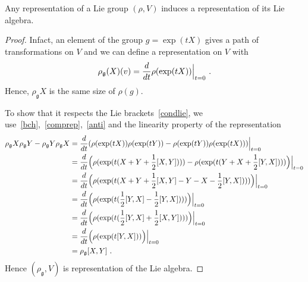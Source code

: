     Any representation of a Lie group $(\rho, V)$ induces a representation of its Lie algebra. 
    \begin{proof}
        Infact, an element of the group $g = \exp(tX)$ gives a path of transformations on $V$ and we can define a representation on $V$ with 
        \begin{equation}\label{repalg}
            \rho_{\mathfrak g} (X) (v) = \frac{d}{dt} \rho (\exp(tX)) \Big \vert_{t=0} ~.
        \end{equation}
        Hence, $\rho_{\mathfrak g} X $ is the same size of $\rho(g)$. 
        
        To show that it respects the Lie brackets~\eqref{condlie}, we use~\eqref{bch},~\eqref{comprep},~\eqref{anti} and the linearity property of the representation
        \begin{equation*}
        \begin{aligned}
            \rho_{\mathfrak g} X \rho_{\mathfrak g} Y - \rho_{\mathfrak g} Y \rho_{\mathfrak g} X & = \frac{d}{dt} (\rho (\exp(tX)) \rho (\exp(tY)) - \rho (\exp(tY)) \rho (\exp(tX)) ) \Big \vert_{t=0} \\ & = \frac{d}{dt} \Big (\rho (\exp(t(X + Y + \frac{1}{2}[X, Y]))) - \rho (\exp(t(Y + X + \frac{1}{2}[Y, X]))) \Big ) \Big \vert_{t=0} \\ & = \frac{d}{dt} \Big (\rho (\exp(t(X + Y + \frac{1}{2}[X, Y] - Y - X - \frac{1}{2}[Y, X]))) \Big ) \Big \vert_{t=0} \\ & = \frac{d}{dt} \Big (\rho (\exp(t(\frac{1}{2}[Y, X] - \frac{1}{2}[Y,X]))) \Big ) \Big \vert_{t=0} \\ & = \frac{d}{dt} \Big (\rho (\exp(t(\frac{1}{2}[Y, X] + \frac{1}{2}[X,Y]))) \Big ) \Big \vert_{t=0}  \\ & = \frac{d}{dt} \Big (\rho (\exp(t[Y, X])) \Big ) \Big \vert_{t=0} \\ & = \rho_{\mathfrak g} [X, Y] ~.
        \end{aligned}
        \end{equation*}      
        Hence $(\rho_{\mathfrak g}, V)$ is representation of the Lie algebra. 
    \end{proof}

